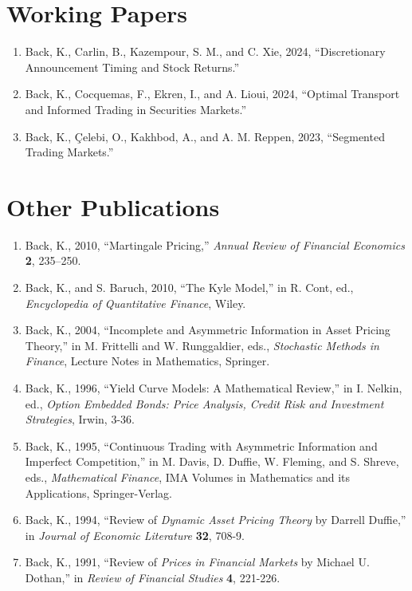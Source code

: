 \documentclass[margin, 11pt]{res}
\begin{document}
\begin{resume}
\section{\sc Working Papers}
\begin{enumerate}
\item Back, K., Carlin, B., Kazempour, S. M., and C. Xie, 2024, ``Discretionary Announcement Timing and Stock Returns.''
\item Back, K., Cocquemas, F., Ekren, I., and A. Lioui, 2024, ``Optimal Transport and Informed Trading in Securities Markets.''
\item Back, K., \c{C}elebi, O., Kakhbod, A., and A. M. Reppen, 2023, ``Segmented Trading Markets.''

\end{enumerate}

\section{\sc Other Publications}
\begin{enumerate}
\item Back, K., 2010, ``Martingale Pricing,'' \textit{Annual Review of Financial Economics} \textbf{2}, 235--250.
\item Back, K., and S. Baruch, 2010, ``The Kyle Model,'' in R. Cont, ed., \textit{Encyclopedia of Quantitative Finance}, Wiley.
\item Back, K., 2004, ``Incomplete and Asymmetric Information in Asset Pricing Theory,'' in M. Frittelli and W. Runggaldier, eds., \textit{Stochastic Methods in Finance}, Lecture Notes in Mathematics, Springer.
\item Back, K., 1996, ``Yield Curve Models: A Mathematical Review,''
in I. Nelkin, ed., {\em Option Embedded
Bonds: Price Analysis, Credit Risk and Investment Strategies}, Irwin, 3-36.
\item Back, K., 1995, ``Continuous Trading with Asymmetric Information and Imperfect
Competition,'' in M. Davis, D. Duffie, W.
Fleming, and S. Shreve, eds., {\em Mathematical Finance},
IMA Volumes in Mathematics
and its Applications, Springer-Verlag.
\item Back, K., 1994, ``Review of {\em Dynamic Asset Pricing Theory\/} by Darrell Duffie,'' in
{\em Journal of Economic Literature\/} {\bf 32}, 708-9.
\item Back, K., 1991, ``Review of {\em Prices in Financial Markets\/} by Michael U.
Dothan,'' in {\em Review of Financial Studies\/} {\bf 4}, 221-226.
\end{enumerate}


\end{resume}
\end{document}
